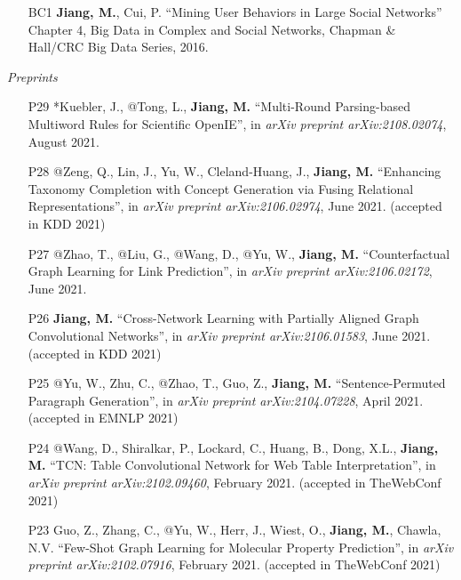 \documentclass[10pt]{article}
\newenvironment{myindentpar}[1]%
{\begin{list}{}%
         {\setlength{\leftmargin}{#1}}%
         \item[]%
}
{\end{list}}
\newcounter{list}
\begin{document}
\begin{myindentpar}{0.00cm}
\begin{enumerate}[leftmargin=.5cm]
\item[BC1] \textbf{Jiang, M.}, Cui, P. ``Mining User Behaviors in Large Social Networks'' Chapter 4, Big Data in Complex and Social Networks, Chapman \& Hall/CRC Big Data Series, 2016.

\end{enumerate}

\hspace{-0.25cm}\textit{Preprints}

\begin{enumerate}[leftmargin=.5cm]

\item[P29] *Kuebler, J., @Tong, L., \textbf{Jiang, M.} ``Multi-Round Parsing-based Multiword Rules for Scientific OpenIE'', in \textit{arXiv preprint arXiv:2108.02074}, August 2021.

\item[P28] @Zeng, Q., Lin, J., Yu, W., Cleland-Huang, J., \textbf{Jiang, M.} ``Enhancing Taxonomy Completion with Concept Generation via Fusing Relational Representations'', in \textit{arXiv preprint arXiv:2106.02974}, June 2021. (accepted in KDD 2021)

\item[P27] @Zhao, T., @Liu, G., @Wang, D., @Yu, W., \textbf{Jiang, M.} ``Counterfactual Graph Learning for Link Prediction'', in \textit{arXiv preprint arXiv:2106.02172}, June 2021.

\item[P26] \textbf{Jiang, M.} ``Cross-Network Learning with Partially Aligned Graph Convolutional Networks'', in \textit{arXiv preprint arXiv:2106.01583}, June 2021. (accepted in KDD 2021)

\item[P25] @Yu, W., Zhu, C., @Zhao, T., Guo, Z., \textbf{Jiang, M.} ``Sentence-Permuted Paragraph Generation'', in \textit{arXiv preprint arXiv:2104.07228}, April 2021. (accepted in EMNLP 2021)

\item[P24] @Wang, D., Shiralkar, P., Lockard, C., Huang, B., Dong, X.L., \textbf{Jiang, M.} ``TCN: Table Convolutional Network for Web Table Interpretation'', in \textit{arXiv preprint arXiv:2102.09460}, February 2021. (accepted in TheWebConf 2021)

\item[P23] Guo, Z., Zhang, C., @Yu, W., Herr, J., Wiest, O., \textbf{Jiang, M.}, Chawla, N.V. ``Few-Shot Graph Learning for Molecular Property Prediction'', in \textit{arXiv preprint arXiv:2102.07916}, February 2021. (accepted in TheWebConf 2021)


\end{enumerate}
\end{myindentpar}
\end{document}

